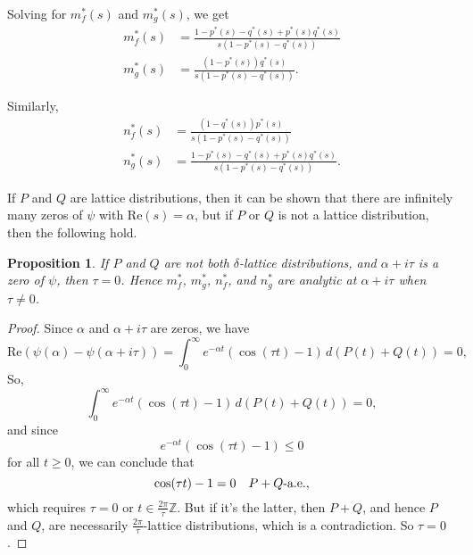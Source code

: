 \documentclass[12pt]{amsart}
\theoremstyle{plain}
\newtheorem{prop}[thm]{Proposition}
\theoremstyle{definition}
\theoremstyle{remark}
\theoremstyle{definition}
\renewcommand{\Re}{\text{Re}}
\begin{document}
Solving for $m_f^*(s)$ and $m_g^*(s)$, we get
\begin{equation}
\begin{aligned}
m_f^*(s) &= \frac{1-p^*(s)-q^*(s)+p^*(s)q^*(s)}{s(1-p^*(s)-q^*(s))} \\
m_g^*(s) &= \frac{(1-p^*(s))q^*(s)}{s(1-p^*(s)-q^*(s))}.
\end{aligned}
\end{equation}

Similarly,
\begin{equation}
\begin{aligned}
n_f^*(s) &= \frac{(1-q^*(s))p^*(s)}{s(1-p^*(s)-q^*(s))} \\
n_g^*(s) &= \frac{1-p^*(s)-q^*(s)+p^*(s)q^*(s)}{s(1-p^*(s)-q^*(s))}.
\end{aligned}
\end{equation}

If $P$ and $Q$ are lattice distributions, then it can be shown that there are infinitely many zeros of $\psi$ with $\Re(s) = \alpha$, but if $P$ or $Q$ is not a lattice distribution, then the following hold.

\begin{prop} \label{mstarAnalytic}
If $P$ and $Q$ are not both $\delta$-lattice distributions, and $\alpha + i \tau$ is a zero of $\psi$, then $\tau = 0$.  Hence $m_f^*$, $m_g^*$, $n_f^*$, and $n_g^*$ are analytic at $\alpha + i\tau$ when $\tau \neq 0$.
\end{prop}

\begin{proof}
Since $\alpha$ and $\alpha + i \tau$ are zeros, we have
\begin{equation}
\Re\left(\psi(\alpha) - \psi(\alpha + i\tau)\right)
 = \int_0^\infty e^{-\alpha t}(\cos(\tau t) - 1) \, d(P(t)+Q(t))
 = 0,
\end{equation}
So,
\begin{equation}
\int_0^\infty e^{-\alpha t}(\cos(\tau t) - 1) \, d(P(t)+Q(t)) = 0,
\end{equation}
and since
\begin{equation}
e^{-\alpha t}(\cos(\tau t) - 1) \leq 0
\end{equation}
for all $t \geq 0$, we can conclude that
\begin{equation}
\cos(\tau t) - 1 = 0 \quad \hbox{$P+Q$-a.e.},
\end{equation}
which requires $\tau = 0$ or $\displaystyle t \in \frac{2\pi}{\tau} \mathbb{Z}$. But if it's the latter, then $P+Q$, and hence $P$ and $Q$, are necessarily $\displaystyle \frac{2\pi}{\tau}$-lattice distributions, which is a contradiction. So $\tau = 0$.
\end{proof}
\end{document}
